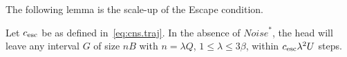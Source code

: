 \documentclass[11pt]{memoir}
\theoremstyle{definition} %
\renewcommand{\le}{\leq}
\renewcommand{\ge}{\geq}
\def\B{B}
\def\U{U}
\newcommand{\Noise}{\mathit{Noise}}
\newcommand{\Q}{Q} %
\newcommand{\cns}[1]{c_{\textrm{\upshape #1}}}
\newcommand{\CEsc}{\cns{esc}}
\begin{document}

The following lemma is the scale-up of the Escape condition.

\begin{lemma}[Escape]\label{lem:escape}
  Let  \( \CEsc \) be as defined in~\eqref{eq:cns.traj}.
  In the absence of \( \Noise^{*} \), the
  head will leave any interval \( G \) of size \( n\B \) with \( n=\lambda\Q \),
  \( 1\le\lambda\le 3\beta \), within \( \CEsc\lambda^{2}\U \) steps.
\end{lemma}
\end{document}
